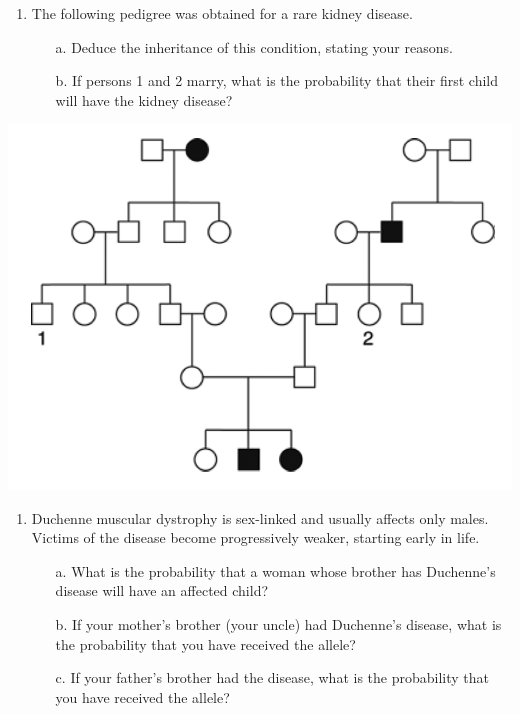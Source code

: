 \documentclass[11pt,]{article}
\providecommand{\tightlist}{%
  \setlength{\itemsep}{0pt}\setlength{\parskip}{0pt}}
\begin{document}
\begin{blackbox}

\begin{enumerate}
\def\labelenumi{\arabic{enumi}.}
\setcounter{enumi}{52}
\tightlist
\item
  The following pedigree was obtained for a rare kidney disease.

  \begin{enumerate} 
   \item[a.]{ Deduce the inheritance of this condition, stating your reasons. } 
   \item[b.]{ If persons 1 and 2 marry, what is the probability that their first child will have the kidney disease? } 
   \end{enumerate}
\end{enumerate}

\hfill\break

\begin{center}\includegraphics[width=0.55\linewidth,]{input/53pedigree} \end{center}

\vspace{12cm}

\end{blackbox}

\begin{blackbox}

\begin{enumerate}
\def\labelenumi{\arabic{enumi}.}
\setcounter{enumi}{60}
\tightlist
\item
  Duchenne muscular dystrophy is sex-linked and usually affects only
  males. Victims of the disease become progressively weaker, starting
  early in life.

  \begin{enumerate} 
   \item[a.]{ What is the probability that a woman whose brother has Duchenne’s disease will have an affected child? } 
   \item[b.]{ If your mother’s brother (your uncle) had Duchenne’s disease, what is the probability that you have received the allele? } 
   \item[c.]{ If your father’s brother had the disease, what is the probability that you have received the allele? } 
   \end{enumerate}
\end{enumerate}

\hfill\break

\vspace{17cm}

\end{blackbox}
\end{document}
